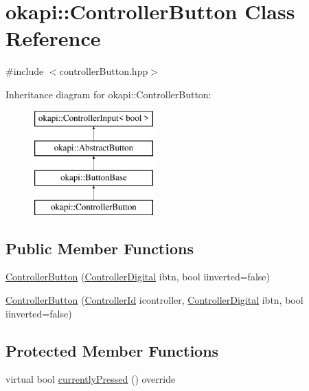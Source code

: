\hypertarget{classokapi_1_1ControllerButton}{}\section{okapi\+::Controller\+Button Class Reference}
\label{classokapi_1_1ControllerButton}


{\ttfamily \#include $<$controller\+Button.\+hpp$>$}

Inheritance diagram for okapi\+::Controller\+Button\+:\begin{figure}[H]
\begin{center}
\leavevmode
\includegraphics[height=4.000000cm]{classokapi_1_1ControllerButton}
\end{center}
\end{figure}
\subsection*{Public Member Functions}
\begin{DoxyCompactItemize}
\item 
\mbox{\hyperlink{classokapi_1_1ControllerButton_a4c82179b73b34bae616c5fe180c207a4}{Controller\+Button}} (\mbox{\hyperlink{namespaceokapi_af5040b3f1f33d27698871423e1453ab6}{Controller\+Digital}} ibtn, bool iinverted=false)
\item 
\mbox{\hyperlink{classokapi_1_1ControllerButton_a491473201555bb78fb5dc20666e12bcf}{Controller\+Button}} (\mbox{\hyperlink{namespaceokapi_a56349a0562b06c6ffc742e94cb1e4361}{Controller\+Id}} icontroller, \mbox{\hyperlink{namespaceokapi_af5040b3f1f33d27698871423e1453ab6}{Controller\+Digital}} ibtn, bool iinverted=false)
\end{DoxyCompactItemize}
\subsection*{Protected Member Functions}
\begin{DoxyCompactItemize}
\item 
virtual bool \mbox{\hyperlink{classokapi_1_1ControllerButton_a35ee73925d03c31b19568530248c0892}{currently\+Pressed}} () override
\end{DoxyCompactItemize}
